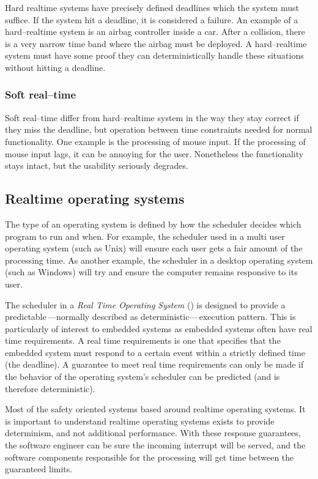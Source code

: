 Hard realtime systems have precisely defined deadlines which the system must suffice. If the system hit a deadline, it is considered a failure. An example of a hard--realtime system is an airbag controller inside a car. After a collision, there is a very narrow time band where the airbag must be deployed. A hard--realtime system must have some proof they can deterministically handle these situations without hitting a deadline.

\subsubsection{Soft real--time}

Soft real--time differ from hard--realtime system in the way they stay correct if they miss the deadline, but operation between time constraints needed for normal functionality. One example is the processing of mouse input. If the processing of mouse input lags, it can be annoying for the user. Nonetheless the functionality stays intact, but the usability seriously degrades.

\subsection{Realtime operating systems}

The type of an operating system is defined by how the scheduler decides which program to run and when. For example, the scheduler used in a multi user operating system (such as Unix) will ensure each user gets a fair amount of the processing time. As another example, the scheduler in a desktop operating system (such as Windows) will try and ensure the computer remains responsive to its user.

The scheduler in a \emph{Real Time Operating System} (\rtos) is designed to provide a predictable\,---normally described as deterministic---\,execution pattern. This is particularly of interest to embedded systems as embedded systems often have real time requirements. A real time requirements is one that specifies that the embedded system must respond to a certain event within a strictly defined time (the deadline). A guarantee to meet real time requirements can only be made if the behavior of the operating system's scheduler can be predicted (and is therefore deterministic).\citep{RTOS}

Most of the safety oriented systems based around realtime operating systems. It is important to understand realtime operating systems exists to provide determinism, and not additional performance. With these response guarantees, the software engineer can be sure the incoming interrupt will be served, and the software components responsible for the processing will get \cpu time between the guaranteed limits.

